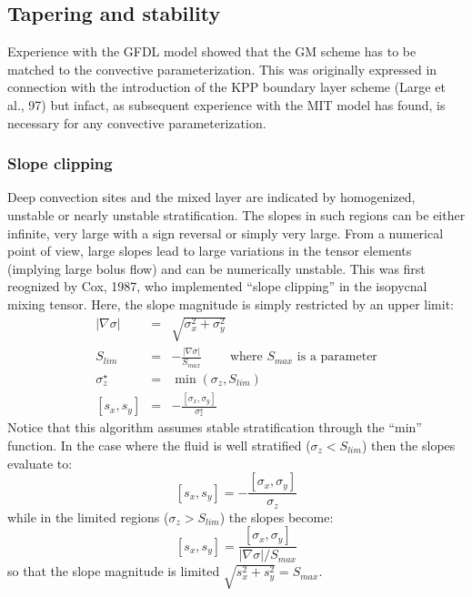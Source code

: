 \subsection{Tapering and stability}

Experience with the GFDL model showed that the GM scheme has to be
matched to the convective parameterization. This was originally
expressed in connection with the introduction of the KPP boundary
layer scheme (Large et al., 97) but infact, as subsequent experience
with the MIT model has found, is necessary for any convective
parameterization.



\subsubsection{Slope clipping}

Deep convection sites and the mixed layer are indicated by
homogenized, unstable or nearly unstable stratification. The slopes in
such regions can be either infinite, very large with a sign reversal
or simply very large. From a numerical point of view, large slopes
lead to large variations in the tensor elements (implying large bolus
flow) and can be numerically unstable. This was first reognized by
Cox, 1987, who implemented ``slope clipping'' in the isopycnal mixing
tensor. Here, the slope magnitude is simply restricted by an upper
limit:
\begin{eqnarray}
|\nabla \sigma| & = & \sqrt{ \sigma_x^2 + \sigma_y^2 } \\
S_{lim} & = & - \frac{|\nabla \sigma|}{ S_{max} }
\;\;\;\;\;\;\;\; \mbox{where $S_{max}$ is a parameter} \\
\sigma_z^\star & = & \min( \sigma_z , S_{lim} ) \\
{[s_x,s_y]} & = & - \frac{ [\sigma_x,\sigma_y] }{\sigma_z^\star}
\end{eqnarray}
Notice that this algorithm assumes stable stratification through the
``min'' function. In the case where the fluid is well stratified ($\sigma_z < S_{lim}$) then the slopes evaluate to:
\begin{equation}
{[s_x,s_y]} = - \frac{ [\sigma_x,\sigma_y] }{\sigma_z}
\end{equation}
while in the limited regions ($\sigma_z > S_{lim}$) the slopes become:
\begin{equation}
{[s_x,s_y]} = \frac{ [\sigma_x,\sigma_y] }{|\nabla \sigma|/S_{max}}
\end{equation}
so that the slope magnitude is limited $\sqrt{s_x^2 + s_y^2} =
S_{max}$.

